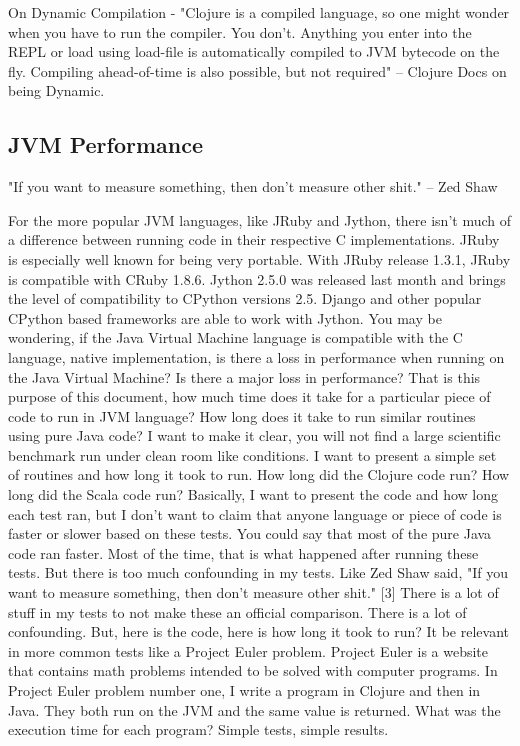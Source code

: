 On Dynamic Compilation - "Clojure is a compiled language, so one might wonder when you have to run the compiler. You don't. Anything you enter into the REPL or load using load-file is automatically compiled to JVM bytecode on the fly. Compiling ahead-of-time is also possible, but not required" -- Clojure Docs on being Dynamic.

\subsection{JVM Performance}

"If you want to measure something, then don’t measure other shit." -- Zed Shaw

For the more popular JVM languages, like JRuby and Jython, there isn't much of a difference between running code in their respective C implementations. JRuby is especially well known for being very portable. With JRuby release 1.3.1, JRuby is compatible with CRuby 1.8.6. Jython 2.5.0 was released last month and brings the level of compatibility to CPython versions 2.5. Django and other popular CPython based frameworks are able to work with Jython. You may be wondering, if the Java Virtual Machine language is compatible with the C language, native implementation, is there a loss in performance when running on the Java Virtual Machine? Is there a major loss in performance? That is this purpose of this document, how much time does it take for a particular piece of code to run in JVM language? How long does it take to run similar routines using pure Java code? I want to make it clear, you will not find a large scientific benchmark run under clean room like conditions. I want to present a simple set of routines and how long it took to run. How long did the Clojure code run? How long did the Scala code run? Basically, I want to present the code and how long each test ran, but I don't want to claim that anyone language or piece of code is faster or slower based on these tests. You could say that most of the pure Java code ran faster. Most of the time, that is what happened after running these tests. But there is too much confounding in my tests. Like Zed Shaw said, "If you want to measure something, then don't measure other shit." [3] There is a lot of stuff in my tests to not make these an official comparison. There is a lot of confounding. But, here is the code, here is how long it took to run? It be relevant in more common tests like a Project Euler problem. Project Euler is a website that contains math problems intended to be solved with computer programs. In Project Euler problem number one, I write a program in Clojure and then in Java. They both run on the JVM and the same value is returned. What was the execution time for each program? Simple tests, simple results.

